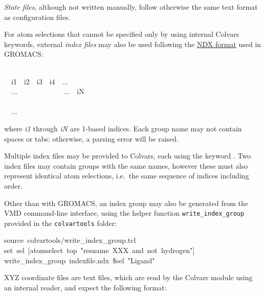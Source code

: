 \emph{State files}, although not written manually, follow otherwise the same text format as configuration files.



For atom selections that cannot be specified only by using internal Colvars keywords, external \emph{index files} may also be used following the \href{http://manual.gromacs.org/documentation/current/reference-manual/file-formats.html\#ndx}{NDX format} used in GROMACS:
\begin{datafileexample}
\\
\-~~i1~~i2~~i3~~i4~~...\\
\-~~...~~~~~~~~~~~~~...~~iN\\
\\
\-~~...
\end{datafileexample}
\noindent{}where \emph{i1} through \emph{iN} are 1-based indices.  Each group name may not contain spaces or tabs: otherwise, a parsing error will be raised.

Multiple index files may be provided to Colvars, each using the keyword .  Two index files may contain groups with the same names, however these must also represent identical atom selections, i.e.\ the same sequence of indices including order.


Other than with GROMACS, an index group may also be generated from the VMD command-line interface, using the helper function \texttt{write\_index\_group} provided in the \texttt{colvartools} folder:
\begin{mdexampleinput}
\-source~colvartools/write\_index\_group.tcl\\
\-set~sel~[atomselect~top~"resname~XXX~and~not~hydrogen"]\\
\-write\_index\_group~indexfile.ndx~\${sel}~"Ligand"
\end{mdexampleinput}


XYZ coordinate files are text files, which are read by the Colvars module using an internal reader, and expect the following format:

